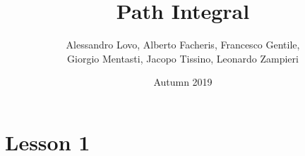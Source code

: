 \documentclass{article}
\title{Path Integral}
\author{Alessandro Lovo, Alberto Facheris, Francesco Gentile,\\
    Giorgio Mentasti, Jacopo Tissino, Leonardo Zampieri}
\date{Autumn 2019}
\begin{document}
\maketitle

\section{Lesson 1}


\end{document}
